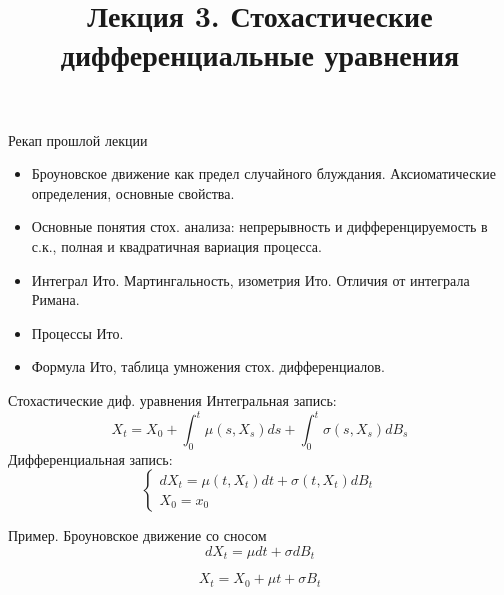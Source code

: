 \documentclass[aspectratio=169]{beamer}
\title[Стохастические дифференциальные уравнения]{Лекция 3. Стохастические дифференциальные уравнения} %
\begin{document}
\begin{frame}
\titlepage 
\end{frame}

\begin{frame}{Рекап прошлой лекции}
    \begin{itemize}
        \item Броуновское движение как предел случайного блуждания. Аксиоматические определения, основные свойства.
        \item Основные понятия стох. анализа: непрерывность и дифференцируемость в с.к., полная и квадратичная вариация процесса.
        \item Интеграл Ито. Мартингальность, изометрия Ито. Отличия от интеграла Римана.
        \item Процессы Ито.
        \item Формула Ито, таблица умножения стох. дифференциалов. 
    \end{itemize}
\end{frame}

\begin{frame}{Стохастические диф. уравнения}
    Интегральная запись:
    $$
        X_t = X_0 + \int_0^t \mu(s, X_s) ds + \int_0^t \sigma(s, X_s) dB_s
    $$
    Дифференциальная запись:
    $$
        \begin{cases}
            d X_t = \mu(t, X_t) dt + \sigma(t, X_t) dB_t \\
            X_0 = x_0
        \end{cases}
    $$
\end{frame}

\begin{frame}{Пример. Броуновское движение со сносом}
    $$
        dX_t = \mu dt + \sigma dB_t 
    $$
     
    $$
        X_t = X_0 + \mu t + \sigma B_t
    $$
\end{frame}
\end{document}
